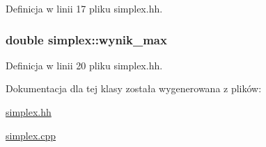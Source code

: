 \-Definicja w linii 17 pliku simplex.\-hh.

\hypertarget{classsimplex_acffe973c35f3638f901a6c66705ddd9b}{
\subsubsection[{wynik\-\_\-max}]{\setlength{\rightskip}{0pt plus 5cm}double {\bf simplex\-::wynik\-\_\-max}}}\label{classsimplex_acffe973c35f3638f901a6c66705ddd9b}


\-Definicja w linii 20 pliku simplex.\-hh.



\-Dokumentacja dla tej klasy została wygenerowana z plików\-:\begin{DoxyCompactItemize}
\item 
\hyperlink{simplex_8hh}{simplex.\-hh}\item 
\hyperlink{simplex_8cpp}{simplex.\-cpp}\end{DoxyCompactItemize}
